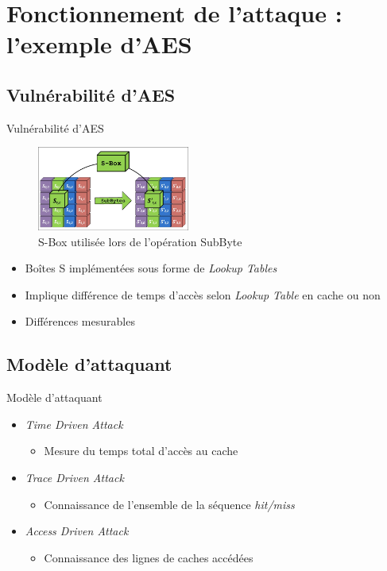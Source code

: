 \documentclass[11pt]{beamer}
\begin{document}
\section{Fonctionnement de l'attaque : l'exemple d'AES}

\subsection{Vulnérabilité d'AES}
\begin{frame}{Vulnérabilité d'AES}
\begin{figure}[h]
  		\centering
  		\includegraphics[width=5cm]{figures/s_box.jpg}
  		\caption{S-Box utilisée lors de l'opération SubByte}
  		\label{sbox} 
	\end{figure}
	\begin{itemize}
		\item Boîtes S implémentées sous forme de \emph{Lookup Tables}
		\item Implique différence de temps d'accès selon \emph{Lookup Table} en cache ou non
		\item Différences mesurables
	\end{itemize}
\end{frame}

\subsection{Modèle d'attaquant}
\begin{frame}{Modèle d'attaquant}
	\begin{itemize}
		\item \emph{Time Driven Attack}
			\begin{itemize}
				\item Mesure du temps total d'accès au cache
			\end{itemize}
		\item \emph{Trace Driven Attack}
			\begin{itemize}
				\item Connaissance de l'ensemble de la séquence \emph{hit/miss}
			\end{itemize}
		\item \emph{Access Driven Attack}
			\begin{itemize}
				\item Connaissance des lignes de caches accédées
			\end{itemize}
	\end{itemize}
	
	
\end{frame}
\end{document}
